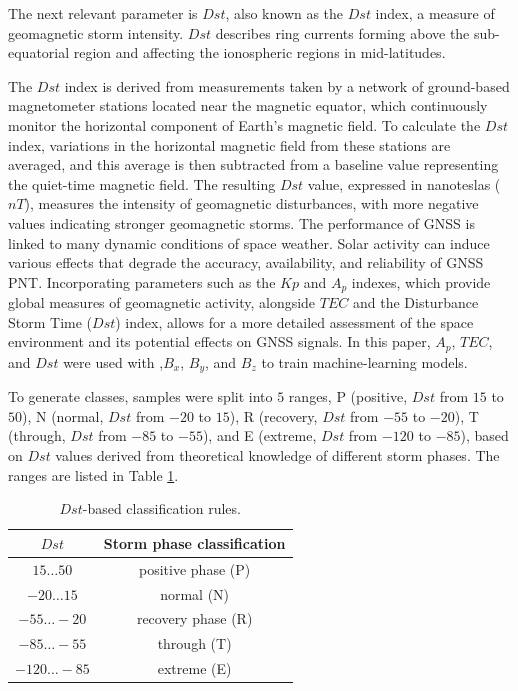 \documentclass[sn-mathphys-num]{sn-jnl}%
\begin{document}
The next relevant parameter is $Dst$, also known as the $Dst$ index, a measure of geomagnetic storm intensity. $Dst$ describes ring currents forming above the sub-equatorial region and affecting the ionospheric regions in mid-latitudes.

The $Dst$ index is derived from measurements taken by a network of ground-based magnetometer stations located near the magnetic equator, which continuously monitor the horizontal component of Earth's magnetic field. To calculate the $Dst$ index, variations in the horizontal magnetic field from these stations are averaged, and this average is then subtracted from a baseline value representing the quiet-time magnetic field. The resulting $Dst$ value, expressed in nanoteslas ($nT$), measures the intensity of geomagnetic disturbances, with more negative values indicating stronger geomagnetic storms. The performance of GNSS is linked to many dynamic conditions of space weather. Solar activity can induce various effects that degrade the accuracy, availability, and reliability of GNSS PNT. Incorporating parameters such as the $Kp$ and $A_p$ indexes, which provide global measures of geomagnetic activity, alongside $TEC$ and the Disturbance Storm Time ($Dst$) index, allows for a more detailed assessment of the space environment and its potential effects on GNSS signals. In this paper, $A_p$, $TEC$, and $Dst$ were used with ,$B_x$, $B_y$, and $B_z$ to train machine-learning models.

To generate classes, samples were split into $5$ ranges, P (positive, $Dst$ from $15$ to $50$), N (normal, $Dst$ from $-20$ to $15$), R (recovery, $Dst$ from $-55$ to $-20$), T (through, $Dst$ from $-85$ to $-55$), and E (extreme, $Dst$ from $-120$ to $-85$), based on $Dst$ values derived from theoretical knowledge of different storm phases. The ranges are listed in Table \ref{tab:Dstranges}.

\begin{table}[!ht]
    \centering
    \caption{$Dst$-based classification rules.}
    \label{tab:Dstranges}
    \begin{tabular}{|c|c|}
        \hline
        $Dst$ & Storm phase classification \\ \hline
        $15\dots50$ & positive phase (P) \\ \hline
        $-20\dots15$ & normal (N) \\ \hline
        $-55\dots-20$ & recovery phase (R) \\ \hline
        $-85\dots-55$ & through (T) \\ \hline
        $-120\dots-85$ & extreme (E) \\ \hline
    \end{tabular}
\end{table}
\end{document}
